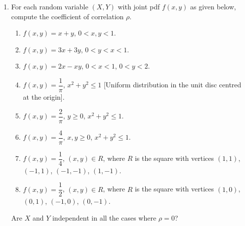 \documentclass[svgnames]{amsart}
\begin{document}
\begin{enumerate}[leftmargin=*]
\item For each random variable $(X, Y)$ with joint pdf $f(x, y)$ as given below, compute the coefficient of correlation $\rho$.
\begin{enumerate}
	\item $f(x, y) = x + y$, $0 < x, y < 1$.
	\item $f(x, y) = 3x + 3y$, $0 < y < x < 1$.
	\item $f(x, y) = 2x - xy$, $0 < x < 1$, $0 < y < 2$.
	\item $f(x, y) = \dfrac 1 \pi$, $x^2 + y^2 \le 1$ [Uniform distribution in the unit disc centred at the origin].
	\item $f(x, y) = \dfrac 2 \pi$, $y \ge 0$, $x^2 + y^2 \le 1$.
	\item $f(x, y) = \dfrac 4 \pi$, $x,y \ge 0$, $x^2 + y^2 \le 1$.
	\item $f(x, y) = \dfrac 1 4$, $(x, y) \in R$, where $R$ is the square with vertices $(1, 1)$, $(-1, 1)$, $(-1, -1)$, $(1, -1)$.
	\item $f(x, y) = \dfrac 1 2$, $(x, y) \in R$, where $R$ is the square with vertices $(1, 0)$, $(0, 1)$, $(-1, 0)$, $(0, -1)$.
\end{enumerate}
Are $X$ and $Y$ independent in all the cases where $\rho = 0$?
\end{enumerate}
\end{document}
